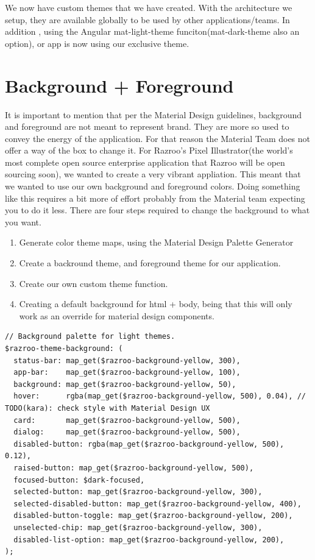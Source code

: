 We now have custom themes that we have created. With the architecture we setup,
they are available globally to be used by other applications/teams. In addition
, using the Angular mat-light-theme funciton(mat-dark-theme also an option), 
or app is now using our exclusive theme. 

\section{Background + Foreground}
It is important to mention that per the Material Design guidelines, background
and foreground are not meant to represent brand. They are more so used to 
convey the energy of the application. For that reason the Material Team does 
not offer a way of the box to change it. For Razroo's Pixel Illustrator(the world's most 
complete open source enterprise application that Razroo will be open sourcing 
soon), we wanted to create a very vibrant appliation. This meant that we 
wanted to use our own background and foreground colors. Doing something like
this requires a bit more of effort probably from the Material team expecting 
you to do it less. There are four steps required to change the background to 
what you want. 

\begin{enumerate}
  \item Generate color theme maps, using the Material Design Palette Generator
  \item Create a backround theme, and foreground theme for our application.
  \item Create our own custom theme function.
  \item Creating a default background for html + body, being that this will 
  only work as an override for material design components. 
\end{enumerate}

\begin{lstlisting}[caption=Example of what a custom background theme looks like.]
// Background palette for light themes.
$razroo-theme-background: (
  status-bar: map_get($razroo-background-yellow, 300),
  app-bar:    map_get($razroo-background-yellow, 100),
  background: map_get($razroo-background-yellow, 50),
  hover:      rgba(map_get($razroo-background-yellow, 500), 0.04), // TODO(kara): check style with Material Design UX
  card:       map_get($razroo-background-yellow, 500),
  dialog:     map_get($razroo-background-yellow, 500),
  disabled-button: rgba(map_get($razroo-background-yellow, 500), 0.12),
  raised-button: map_get($razroo-background-yellow, 500),
  focused-button: $dark-focused,
  selected-button: map_get($razroo-background-yellow, 300),
  selected-disabled-button: map_get($razroo-background-yellow, 400),
  disabled-button-toggle: map_get($razroo-background-yellow, 200),
  unselected-chip: map_get($razroo-background-yellow, 300),
  disabled-list-option: map_get($razroo-background-yellow, 200),
);
\end{lstlisting}

